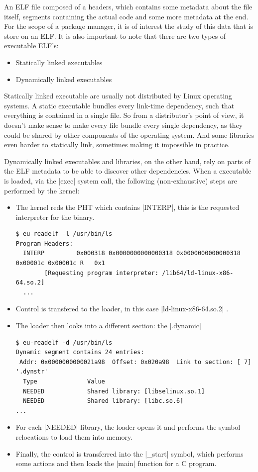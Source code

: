 An ELF file composed of a headers, which contains some
metadata about the file itself, segments containing the
actual code and some more metadata at the end. For the scope
of a package manager, it is of interest the study of this
data that is store on an ELF. It is also important to note
that there are two types of executable ELF's:

\begin{itemize}
    \item Statically linked executables
    \item Dynamically linked executables
\end{itemize}

Statically linked executable are usually not distributed by
Linux operating systems. A static executable bundles every
link-time dependency, such that everything is contained in a
single file. So from a distributor's point of view, it
doesn't make sense to make every file bundle every single
dependency, as they could be shared by other components of
the operating system. And some libraries even harder to
statically link, sometimes making it impossible in practice.

Dynamically linked executables and libraries, on the other
hand, rely on parts of the ELF metadata to be able to
discover other dependencies. When a executable is loaded,
via the |exec| system call, the following (non-exhaustive) steps are
performed by the kernel:

\begin{itemize}
    \item The kernel reds the \acl{PHT} which contains
    |INTERP|, this is the requested interpreter for the
    binary.
    \begin{verbatim}
$ eu-readelf -l /usr/bin/ls
Program Headers:
  INTERP         0x000318 0x0000000000000318 0x0000000000000318 0x00001c 0x00001c R   0x1
        [Requesting program interpreter: /lib64/ld-linux-x86-64.so.2]
  ...
    \end{verbatim}
    \item Control is transfered to the loader, in this case
    |ld-linux-x86-64.so.2| .
    \item The loader then looks into a different section:
    the |.dynamic|
    \begin{verbatim}
$ eu-readelf -d /usr/bin/ls
Dynamic segment contains 24 entries:
 Addr: 0x0000000000021a98  Offset: 0x020a98  Link to section: [ 7] '.dynstr'
  Type              Value
  NEEDED            Shared library: [libselinux.so.1]
  NEEDED            Shared library: [libc.so.6]
...
\end{verbatim}
    \item For each |NEEDED| library, the loader opens it and
    performs the symbol relocations to load them into
    memory.
    \item Finally, the control is transferred into the
    |_start| symbol, which performs some actions and then
    loads the |main| function for a C program.
\end{itemize}

